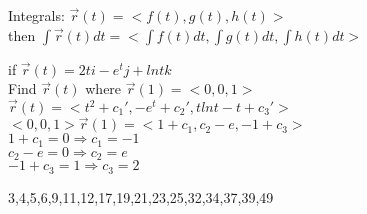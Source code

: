 \begin{definition}
Integrals:
$\overrightarrow{r}(t)=<f(t),g(t),h(t)>$\\
then $\int\overrightarrow{r}(t)dt=<\int f(t)dt,\int g(t)dt,\int h(t)dt>$
\end{definition}
\noindent{\color{smalt(darkpowderblue)}\rule{\linewidth}{.2mm}}
\begin{example}
if $\overrightarrow{r}(t)=2ti-e^tj+lnt k$\\
Find $\overrightarrow{r}(t)$ where $\overrightarrow{r}(1)=<0,0,1>$
$\overrightarrow{r}(t)=<t^2+c_1',-e^t+c_2',tlnt-t+c_3'>$
$<0,0,1>\overrightarrow{r}(1)=<1+c_1,c_2-e,-1+c_3>$\\
$1+c_1=0\Rightarrow c_1=-1$\\
$c_2-e=0\Rightarrow c_2=e$\\
$-1+c_3=1\Rightarrow c_3=2$
\end{example}
\noindent{\color{smalt(darkpowderblue)}\rule{\linewidth}{.2mm}}
\begin{problem}
3,4,5,6,9,11,12,17,19,21,23,25,32,34,37,39,49
\end{problem}
